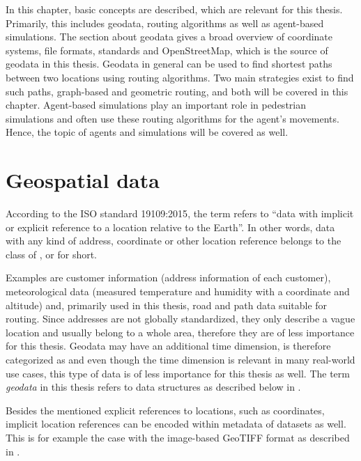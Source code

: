 
In this chapter, basic concepts are described, which are relevant for this thesis.
Primarily, this includes geodata, routing algorithms as well as agent-based simulations.
The section about geodata gives a broad overview of coordinate systems, file formats, standards and OpenStreetMap, which is the source of geodata in this thesis.
Geodata in general can be used to find shortest paths between two locations using routing algorithms.
Two main strategies exist to find such paths, graph-based and geometric routing, and both will be covered in this chapter.
Agent-based simulations play an important role in pedestrian simulations and often use these routing algorithms for the agent's movements.
Hence, the topic of agents and simulations will be covered as well.

\section{Geospatial data}

	According to the ISO standard 19109:2015\cite{iso-19109}, the term  refers to \enquote{data with implicit or explicit reference to a location relative to the Earth}.
	In other words, data with any kind of address, coordinate or other location reference belongs to the class of , or  for short.
	
	Examples are customer information (address information of each customer), meteorological data (measured temperature and humidity with a coordinate and altitude) and, primarily used in this thesis, road and path data suitable for routing.
	Since addresses are not globally standardized, they only describe a vague location and usually belong to a whole area, therefore they are of less importance for this thesis.
	Geodata may have an additional time dimension, is therefore categorized as \cite{iso-19108} and even though the time dimension is relevant in many real-world use cases, this type of data is of less importance for this thesis as well.
	The term \emph{geodata} in this thesis refers to data structures as described below in .
	
	Besides the mentioned explicit references to locations, such as coordinates, implicit location references can be encoded within metadata of datasets as well.
	This is for example the case with the image-based GeoTIFF format as described in .
		
